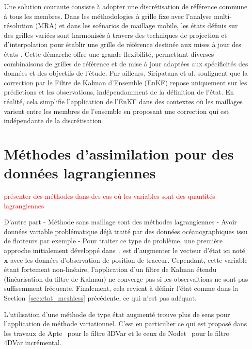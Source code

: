 Une solution courante consiste à adopter une discrétisation de référence commune à tous les membres. Dans les méthodologies à grille fixe avec l'analyse multi-résolution (MRA) et dans les scénarios de maillage mobile, les états définis sur des grilles variées sont harmonisés à travers des techniques de projection et d'interpolation pour établir une grille de référence destinée aux mises à jour des états \cite{siripatana_combining_2019, bonan_data_2017}. Cette démarche offre une grande flexibilité, permettant diverses combinaisons de grilles de référence et de mise à jour adaptées aux spécificités des données et des objectifs de l'étude. Par ailleurs, Siripatana et al. \cite{siripatana_combining_2019} soulignent que la correction par le Filtre de Kalman d’Ensemble (EnKF) repose uniquement sur les prédictions et les observations, indépendamment de la définition de l'état. En réalité, cela simplifie l'application de l'EnKF dans des contextes où les maillages varient entre les membres de l'ensemble en proposant une correction qui est indépendante de la discrétisation



\section{Méthodes d'assimilation pour des données lagrangiennes}
\textcolor{red}{présenter des méthodes dans des cas où les variables sont des quantités lagrangiennes}

D'autre part
- Méthode sans maillage sont des méthodes lagrangiennes
- Avoir données variable problématique déjà traité par des données océanographiques issu de flotteurs par exemple
- Pour traiter ce type de problème, une première approche initialement développé dans~\cite{ide_2002}, est d'augmenter le vecteur d'état ici noté $\bm x$ avec les données d'observation de position de traceur. Cependant, cette variable étant fortement non-linéaire, l'application d'un filtre de Kalman étendu (linéarisation du filtre de Kalman) ne converge pas si les observaitions ne sont pas suffisemment fréquente. Finalement, cela revient à définir l'état comme dans la Section~\ref{sec:etat_meshless} précédente, ce qui n'est pas adéquat.

L'utilisation d'une méthode de type état augmenté trouve plus de sens pour l'application de méthode variationnel.
C'est en particulier ce qui est proposé dans les travaux de Apte~\cite{apte_2008} pour le filtre 3DVar et le ceux de Nodet~\cite{nodet_2006} pour le filtre 4DVar incrémental.

